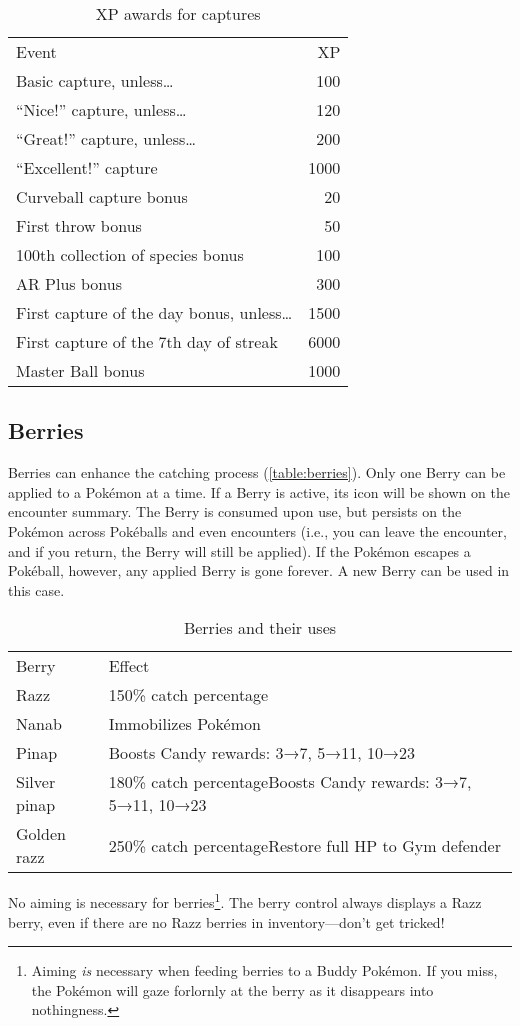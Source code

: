 \begin{table}
\centering
\begin{tabular}{lr}
Event & XP \\
\Midrule
Basic capture, unless\ldots & 100\\
``Nice!'' capture, unless\ldots & 120\\
``Great!'' capture, unless\ldots & 200\\
``Excellent!'' capture & 1000\\
Curveball capture bonus & 20\\
First throw bonus & 50\\
100th collection of species bonus & 100\\
AR Plus bonus & 300\\
First capture of the day bonus, unless\ldots & 1500\\
First capture of the 7th day of streak & 6000\\
Master Ball bonus & 1000\\
\end{tabular}
  \caption{XP awards for captures\label{table:catchxp}}
\end{table}

\subsection{Berries\label{sec:berries}}
Berries can enhance the catching process (\autoref{table:berries}).
Only one Berry can be applied to a Pokémon at a time.
If a Berry is active, its icon will be shown on the encounter summary.
The Berry is consumed upon use, but persists on the Pokémon across Pokéballs
  and even encounters (i.e., you can leave the encounter, and if you return,
  the Berry will still be applied).
If the Pokémon escapes a Pokéball, however, any applied Berry is gone forever.
A new Berry can be used in this case.
\begin{table}
  \centering
  \begin{tabular}{lp{}}
Berry & Effect \\
\Midrule
Razz  & 150\% catch percentage\\
Nanab & Immobilizes Pokémon\\
Pinap & Boosts Candy rewards: 3→7, 5→11, 10→23\\
Silver pinap & 180\% catch percentage\newline Boosts Candy rewards: 3→7, 5→11, 10→23\\
Golden razz & 250\% catch percentage\newline Restore full HP to Gym defender\\
\end{tabular}
  \caption{Berries and their uses\label{table:berries}}
\end{table}
No aiming is necessary for berries\footnote{Aiming \textit{is} necessary when feeding berries to a Buddy Pokémon.
If you miss, the Pokémon will gaze forlornly at the berry as it disappears into nothingness.}.
The berry control always displays a Razz berry, even if there
  are no Razz berries in inventory---don't get tricked!

